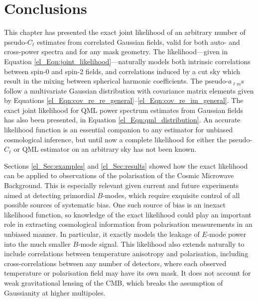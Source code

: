 \section{Conclusions}
\label{el_Sec:conclusions}

This chapter has presented the exact joint likelihood of an arbitrary number of pseudo-$C_\ell$ estimates from correlated Gaussian fields, valid for both auto- and cross-power spectra and for any mask geometry. The likelihood---given in Equation \eqref{el_Eqn:joint_likelihood}---naturally models both intrinsic correlations between spin-0 and spin-2 fields, and correlations induced by a cut sky which result in the mixing between spherical harmonic coefficients. The pseudo-$a_{\ell m}$s follow a multivariate Gaussian distribution with covariance matrix elements given by Equations \eqref{el_Eqn:cov_re_re_general}--\eqref{el_Eqn:cov_re_im_general}. The exact joint likelihood for QML power spectrum estimates from Gaussian fields has also been presented, in Equation \eqref{el_Eqn:qml_distribution}. An accurate likelihood function is an essential companion to any estimator for unbiased cosmological inference, but until now a complete likelihood for either the pseudo-$C_\ell$ or QML estimator on an arbitrary sky has not been known.

Sections \ref{el_Sec:examples} and \ref{el_Sec:results} showed how the exact likelihood can be applied to observations of the polarisation of the Cosmic Microwave Background. This is especially relevant given current and future experiments aimed at detecting primordial $B$-modes, which require exquisite control of all possible sources of systematic bias. One such source of bias is an inexact likelihood function, so knowledge of the exact likelihood could play an important role in extracting cosmological information from polarisation measurements in an unbiased manner. In particular, it exactly models the leakage of $E$-mode power into the much smaller $B$-mode signal. This likelihood also extends naturally to include correlations between temperature anisotropy and polarisation, including cross-correlations between any number of detectors, where each observed temperature or polarisation field may have its own mask. It does not account for weak gravitational lensing of the CMB, which breaks the assumption of Gaussianity at higher multipoles.

